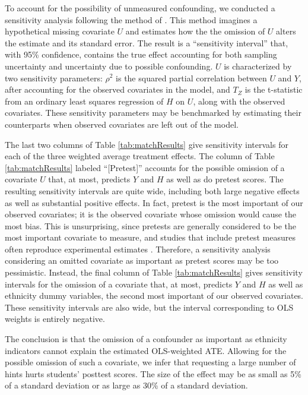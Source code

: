 \documentclass{article}\usepackage[]{graphicx}\usepackage[]{color}
\begin{document}
To account for the possibility of unmeasured confounding, we conducted
a sensitivity analysis following the method of \citet{hhh}.
This method imagines a hypothetical missing covariate $U$ and estimates
how the the omission of $U$ alters the estimate
and its standard error.
The result is a ``sensitivity interval'' \citep[c.f.][]{rosenbaum2002observational} that,
with 95\% confidence, contains the true effect accounting for both
sampling uncertainty and uncertainty due to possible confounding.
$U$ is characterized by two sensitivity parameters:
$\rho^2$ is the squared partial correlation between $U$ and $Y$, after
accounting for the observed covariates in the model, and $T_Z$ is the
t-statistic from an ordinary least squares regression of $H$ on $U$, along with the observed covariates.
These sensitivity parameters may be benchmarked by estimating their
counterparts when observed covariates are left out of the model.

The last two columns of Table \ref{tab:matchResults} give sensitivity intervals for each of the three weighted average treatment effects.
The column of Table \ref{tab:matchResults} labeled ``[Pretest]''
accounts for the possible omission of a covariate $U$ that, at most, predicts $Y$ and $H$ as well as do pretest scores.
The resulting sensitivity intervals are quite wide, including
both large negative effects as well as substantial positive
effects.
In fact, pretest is the most important of our observed covariates; it is the observed covariate whose omission would cause the most bias.
This is unsurprising, since pretests are generally considered to be the most important covariate to measure, and studies that include pretest measures often reproduce experimental estimates \citep[e.g.][]{cook2008three,cook2009bias}.
Therefore, a sensitivity analysis considering an omitted covariate as important as pretest scores may be too pessimistic.
Instead,
the final column of Table \ref{tab:matchResults} gives sensitivity intervals for the omission of a covariate that, at most, predicts $Y$ and $H$ as well as ethnicity dummy variables, the second most important of our observed covariates.
These sensitivity intervals are also wide, but the interval corresponding
to OLS weights is entirely negative.

The conclusion is that the omission of a confounder as important as ethnicity indicators
cannot explain the estimated OLS-weighted ATE.
Allowing for the possible omission of such a covariate, we infer that requesting a
large number of hints hurts students' posttest scores.
The size of the effect may be as small as
5\% of a standard deviation
or as large as 30\% of a standard deviation.
\end{document}
